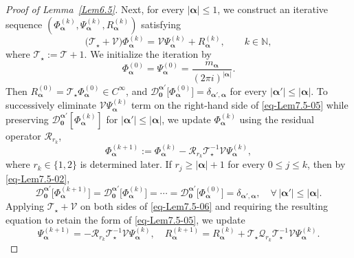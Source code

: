 \documentclass{sn-jnl}%
\numberwithin{equation}{section}
\theoremstyle{thmstyleone}%
\theoremstyle{thmstyletwo}%
\theoremstyle{thmstylethree}%
\begin{document}
\begin{appendices}
\begin{proof}[Proof of Lemma~\ref{Lem6.5}]
Next, for every $|\bm \alpha|\leq 1$, we construct an iterative sequence
$(\Phi_{\bm \alpha}^{(k)},\Psi_{\bm \alpha}^{(k)},R_{\bm \alpha}^{(k)})$
satisfying
\begin{equation}\label{eq-Lem7.5-05}
    \bigl(\mathcal{T}_{\star}+\mathcal{V}\bigr)
    \Phi_{\bm \alpha}^{(k)}
    =
    \mathcal{V}\Psi_{\bm \alpha}^{(k)}
    +R_{\bm \alpha}^{(k)},
    \qquad k\in \mathbb{N},
\end{equation}
where $\mathcal{T}_{\star}:=\mathcal{T}+1$. We initialize the iteration by
\begin{equation}\label{eq-Lem7.5-05.1}
    \Phi_{\bm \alpha}^{(0)}
    =
    \Psi_{\bm \alpha}^{(0)}
    =
    \frac{m_{\bm \alpha}}{(2\pi i)^{|\bm \alpha|}}.
\end{equation}
Then $R_{\bm \alpha}^{(0)}=\mathcal{T}_{\star}\Phi_{\bm \alpha}^{(0)}\in C^{\infty}$, and
$\mathcal{D}^{\bm \alpha'}_{\bm 0}
\bigl[\Phi_{\bm \alpha}^{(0)}\bigr]
=
\delta_{\bm \alpha',\bm \alpha}$ for every
$|\bm \alpha'|\leq |\bm \alpha|.$
To successively eliminate
$\mathcal{V}\Psi_{\bm \alpha}^{(k)}$ term on the right-hand side of \eqref{eq-Lem7.5-05} while preserving $\mathcal{D}_{\bm 0}^{\bm \alpha'}[\Phi_{\bm \alpha}^{(k)}]$ for $|\bm \alpha'|\leq |\bm \alpha|$, we update $\Phi_{\bm \alpha}^{(k)}$ using the residual operator $\mathcal{R}_{r_k}$,
\begin{equation}\label{eq-Lem7.5-06}
    \Phi^{(k+1)}_{\bm \alpha}
    :=
    \Phi_{\bm \alpha}^{(k)}
    -
    \mathcal{R}_{r_k}
    \mathcal{T}_{\star}^{-1}
    \mathcal{V}
    \Psi_{\bm \alpha}^{(k)},
\end{equation}
where $r_k \in \{1,2\}$ is determined later.
If $r_j\geq |\bm \alpha|+1$ for every $0\leq j\leq k$, then by \eqref{eq-Lem7.5-02},
\begin{equation}\label{eq-Lem7.5-07}
\mathcal{D}^{\bm \alpha'}_{\bm 0}\bigl[\Phi_{\bm \alpha}^{(k+1)}\bigr] = \mathcal{D}^{\bm \alpha'}_{\bm 0}\bigl[\Phi_{\bm \alpha}^{(k)}\bigr]=\cdots=\mathcal{D}^{\bm \alpha'}_{\bm 0}\bigl[\Phi_{\bm \alpha}^{(0)}\bigr]=\delta_{\bm \alpha',\bm \alpha},\quad \forall\, |\bm \alpha'|\leq |\bm \alpha|.
\end{equation}
Applying $\mathcal{T}_{\star}+\mathcal{V}$ on both sides of \eqref{eq-Lem7.5-06} and requiring the resulting equation to retain the form of \eqref{eq-Lem7.5-05}, we update
\begin{equation}\label{eq-Lem7.5-08}
    \Psi_{\bm \alpha}^{(k+1)} = -\mathcal{R}_{r_k}\mathcal{T}_\star^{-1}\mathcal{V}\Psi_{\bm \alpha}^{(k)},\quad R_{\bm \alpha}^{(k+1)}= R^{(k)}_{\bm \alpha}+\mathcal{T}_{\star}\mathcal{Q}_{r_k}\mathcal{T}_{\star}^{-1}\mathcal{V}\Psi_{\bm \alpha}^{(k)}.
\end{equation}


\end{proof}
\end{appendices}
\end{document}
